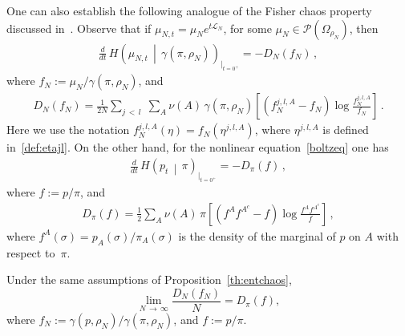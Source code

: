 \documentclass[AHL,Unicode,longabstracts,published]{cedram}
\newcommand{\si}{\sigma}
\newcommand{\cL}{\mathcal{L}}
\newcommand{\cP}{\mathcal{P}}
\let\g=\gamma
\let\r=\rho
\let\O=\Omega
\begin{document}
One can also establish the following analogue of the Fisher chaos property discussed in~\cite{onkacschaos}. Observe that if $\mu_{N,t}=\mu_N e^{t\cL_N}$, for some $\mu_N\in\cP(\O_{\r_N})$, then
\begin{align}\label{eq:fish1}
\frac{d}{dt}\, H\left(\mu_{N,t}\,\middle|\,\g(\pi,\r_N)\right)_{\vert_{t=0^+}} = -D_N(f_N)\,,
\end{align}
where $f_N:=\mu_N/\g(\pi,\r_N)$, and
\begin{align}\label{eq:fish2}
D_N(f_N) = \frac1{2N}\sum_{j\,<\,l}\;\sum_A\nu(A)\,\g(\pi,\r_N)\left[\left(f_N^{j,l,A}-f_N\right)\log\frac{f_N^{j,l,A}}{f_N}\right]\,.
\end{align}
Here we use the notation $f_N^{j,l,A}(\eta)=f_N(\eta^{j,l,A})$, where $\eta^{j,l,A}$ is defined in~\eqref{def:etajl}. On the other hand, for the nonlinear equation~\eqref{boltzeq} one has
\begin{align}\label{eq:fish3}
\frac{d}{dt}\, H\left(p_t\,\middle|\, \pi\right)_{\vert_{t=0^+}} = -D_\pi(f)\,,
\end{align}
where $f:=p/\pi$, and
\begin{align}\label{eq:fish4}
D_\pi(f) =\frac12 \sum_A\nu(A)\,\pi\left[\left(f^Af^{A^c}-f\right)\log\frac{f^Af^{A^c}}{f}\right]\,,
\end{align}
where $f^A(\si)=p_A(\si)/\pi_A(\si)$ is the density of the marginal of $p$ on $A$ with respect to~$\pi$.


\begin{prop}\label{dff2tyhm}
Under the same assumptions of Proposition~\ref{th:entchaos},
\begin{equation}\label{dff2}
\lim_{N\,\to\,\infty}\frac{D_N(f_N)}{N} = D_\pi(f),
\end{equation}
where $f_N:=\gamma(p,\r_N)/\g(\pi,\r_N)$, and $f:=p/\pi$.
\end{prop}
\end{document}
